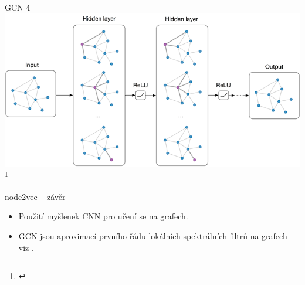 \documentclass[10pt]{beamer}
\begin{document}
\begin{frame}{GCN 4}
	\centering
	\includegraphics[width=0.8\pagewidth]{images/GCN.png}\footnote{\cite{kipf_how_2016}}
\end{frame}

\begin{frame}{node2vec -- závěr}
	\begin{itemize}
		\item Použití myšlenek CNN pro učení se na grafech.
		\item GCN jsou aproximací prvního řádu lokálních spektrálních filtrů na grafech - viz \cite{kipf_semi-supervised_2016}.
	\end{itemize}
\end{frame}
\end{document}

